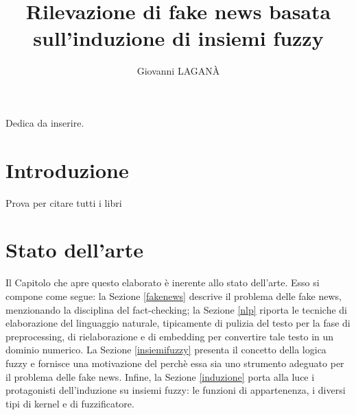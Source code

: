 \documentclass[12pt]{report}
\theoremstyle{definition}
\begin{document}
\title{Rilevazione di fake news basata sull'induzione di insiemi fuzzy}
\author{Giovanni LAGANÀ}
%
%
%
\beforepreface
        {\hfill \Large {\sl \begin{flushright} Dedica da inserire.         
\end{flushright}         }}
%
%
%
%
\afterpreface

%
%

\chapter*{Introduzione}
  
\onehalfspacing

Prova per citare tutti i libri
\cite{1,2,3,4,5,6,7,8,9,10,11,12,13,14,15,16,17,18,19,20,21,22}


\chapter{Stato dell'arte}
\label{Capitolo 1}
\onehalfspacing

Il Capitolo che apre questo elaborato è inerente allo stato dell'arte. Esso si compone come segue: la Sezione \ref{fakenews} descrive il problema delle fake news, menzionando la disciplina del fact-checking; la Sezione \ref{nlp} riporta le tecniche di elaborazione del linguaggio naturale, tipicamente di pulizia del testo per la fase di preprocessing, di rielaborazione e di embedding per convertire tale testo in un dominio numerico.
La Sezione \ref{insiemifuzzy} presenta il concetto della logica fuzzy e fornisce una motivazione del perchè essa sia uno strumento adeguato per il problema delle fake news.
Infine, la Sezione \ref{induzione} porta alla luce i protagonisti dell'induzione su insiemi fuzzy: le funzioni di appartenenza, i diversi tipi di kernel e di fuzzificatore.
\end{document}
